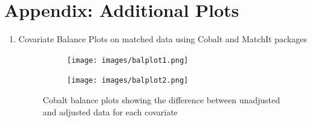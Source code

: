 \documentclass[journal,onecolumn, 12pt]{article}
\begin{document}
\clearpage
\section{Appendix: Additional Plots }
\label{appendix:D}
\begin{enumerate}
\item \large{Covariate Balance Plots on matched data using Cobalt and MatchIt packages}
\begin{figure}[h]
    \centering
    \begin{subfigure}{\textwidth}
    \texttt{[image: images/balplot1.png]} 
    \end{subfigure}
    \begin{subfigure}{\textwidth}
    \texttt{[image: images/balplot2.png]}
    \end{subfigure}
\vspace*{+5mm}
\caption{Cobalt balance plots showing the difference between unadjusted and adjusted data for each covariate}
\label{fig: balplot}
\end{figure}
\end{enumerate}

\clearpage
\end{document}
